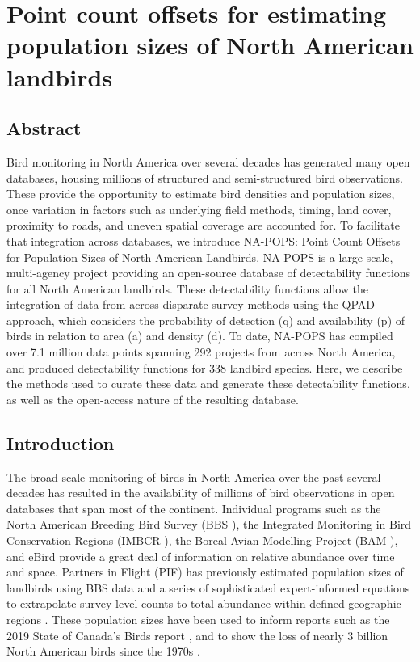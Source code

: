 \chapter{Point count offsets for estimating population sizes of North American landbirds}

\section{Abstract}
Bird monitoring in North America over several decades has generated many open databases, housing millions of structured and semi-structured bird observations. These provide the opportunity to estimate bird densities and population sizes, once variation in factors such as underlying field methods, timing, land cover, proximity to roads, and uneven spatial coverage are accounted for. To facilitate that integration across databases, we introduce NA-POPS: Point Count Offsets for Population Sizes of North American Landbirds. NA-POPS is a large-scale, multi-agency project providing an open-source database of detectability functions for all North American landbirds. These detectability functions allow the integration of data from across disparate survey methods using the QPAD approach, which considers the probability of detection (q) and availability (p) of birds in relation to area (a) and density (d). To date, NA-POPS has compiled over 7.1 million data points spanning 292 projects from across North America, and produced detectability functions for 338 landbird species. Here, we describe the methods used to curate these data and generate these detectability functions, as well as the open-access nature of the resulting database. 

\section{Introduction}
\par The broad scale monitoring of birds in North America over the past several decades has resulted in the availability of millions of bird observations in open databases that span most of the continent. Individual programs such as the North American Breeding Bird Survey (BBS \citep{hudson_role_2017, sauer_first_2017}), the Integrated Monitoring in Bird Conservation Regions (IMBCR \citep{pavlacky_statistically_2017}), the Boreal Avian Modelling Project (BAM \citep{cumming_toward_2010}), and eBird \citep{sullivan_ebird_2014} provide a great deal of information on relative abundance over time and space. Partners in Flight (PIF) has previously estimated population sizes of landbirds using BBS data and a series of sophisticated expert-informed equations to extrapolate survey-level counts to total abundance within defined geographic regions \citep{rosenberg_setting_2005, will_handbook_2020}. These population sizes have been used to inform reports such as the 2019 State of Canada’s Birds report \citep{north_american_bird_conservation_initiative_canada_state_2019}, and to show the loss of nearly 3 billion North American birds since the 1970s \citep{rosenberg_decline_2019}.

